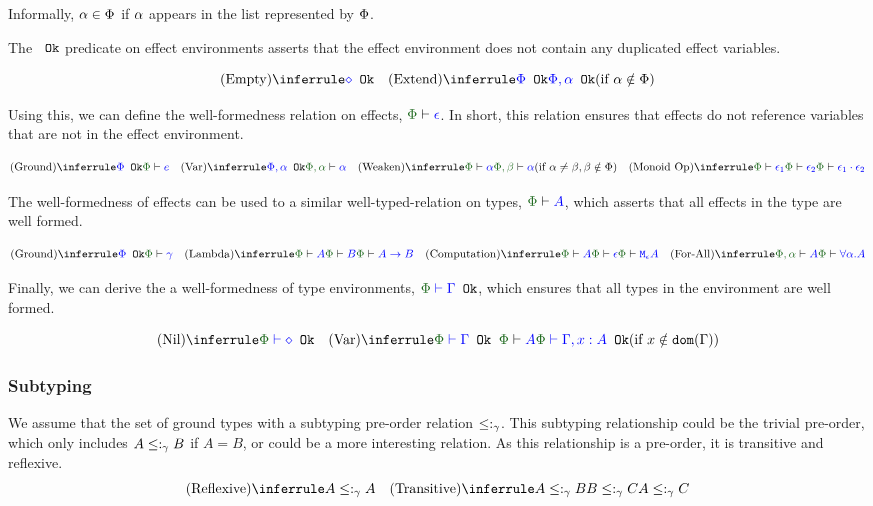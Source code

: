\documentclass{Report}
\begin{document}
Informally, $\a \in \P$ if $\a$ appears in the list represented by $\P$.

The $\ok{}$ predicate on effect environments asserts that the effect environment does not contain any duplicated effect variables.

\[
    \ntreerulez{Empty}{\ok{\nil}}
\quad
    \condtreeruleI{Extend}{\ok{\P}}{\ok{\P, \a}}{\a\notin \P}
\]

Using this, we can define the well-formedness relation on effects, $\wellformed{\P}{\e}$. In short, this relation ensures that effects do not reference variables that are not in the effect environment.

\[
    \ntreeruleI{Ground}{\ok{\P}}{\wellformed{\P}{e}}
    \quad
    \ntreeruleI{Var}{\ok{\P,\a}}{\wellformed{\P,\a}{\a}}
    \quad
    \condtreeruleI{Weaken}{\wellformed{\P}{\a}}{\wellformed{\P,\b}{\a}}{\a\neq\b, \b\notin\P}
    \quad
    \ntreeruleII{Monoid Op}{\wellformed{\P}{\e_1}}{\wellformed{\P}{\e_2}}{\wellformed{\P}{\e_1\dot\e_2}}
\]

The well-formedness of effects can be used to a similar well-typed-relation on types, $\wellformed{\P}{A}$, which asserts that all effects in the type are well formed.

\[
    \ntreeruleI{Ground}{\ok{\P}}{\wellformed{\P}{\g}}
    \quad
    \ntreeruleII{Lambda}{\wellformed{\P}{A}}{\wellformed{\P}{B}}{\wellformed{\P}{\ab}}
    \quad
    \ntreeruleII{Computation}{\wellformed{\P}{A}}{\wellformed{\P}{\e}}{\wellformed{\P}{\mea}}
    \quad
    \ntreeruleI{For-All}{\wellformed{\P,\a}{A}}{\wellformed{\P}{\all{\a}{A}}}
\]

Finally, we can derive the a well-formedness of type environments,   $\oke{\P}{\G}$, which ensures that all types in the environment are well formed.

\[
    \ntreerulez{Nil}{\oke{\P}{\nil}}
    \quad
    \condtreeruleI{Var}{\oke{\P}{\G}\s\s \wellformed{\P}{A}}{\oke{\P}{\gax}}{x\notin\dom{\G}}
\]

\subsubsection{Subtyping}

We assume that the set of ground types with a subtyping pre-order relation $\subtype_{\ground}$. This subtyping relationship could be the trivial pre-order, which only includes $A\subtypeg B$ if $A = B$, or could be a more interesting relation. As this relationship is a pre-order, it is transitive and reflexive.
    \[
        \ntreerulez{Reflexive}{A \subtype_{\ground} A}
        \quad
        \ntreeruleII{Transitive}{A \subtype_{\ground} B}{B \subtype_{\ground} C}{A \subtype_{\ground} C}
    \]
\end{document}
